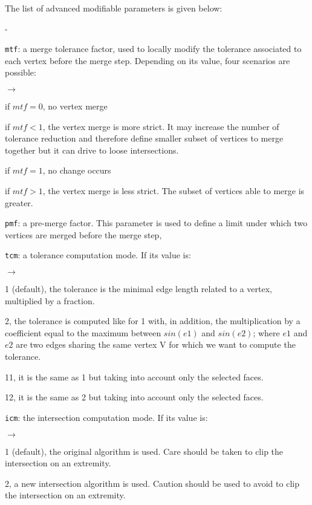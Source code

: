 {{{The list of advanced modifiable parameters is given below:
\begin{list}{-}{}
\item \texttt{mtf}: a merge tolerance factor, used to locally modify the tolerance associated to each vertex before the merge step. Depending on its value, four
scenarios are possible:
\begin{list}{$\rightarrow$}{}
\item if $mtf=0$, no vertex merge
\item if $mtf<1$, the vertex merge is more strict. It may increase the number of tolerance reduction and therefore define smaller subset of vertices to merge together but it can drive to loose intersections.
\item if $mtf=1$, no change occurs
\item if $mtf>1$, the vertex merge is less strict. The subset of vertices able to merge is greater.
\end{list}
\item \texttt{pmf}: a pre-merge factor. This parameter is used to define a limit under which two vertices are merged before the merge step,
\item \texttt{tcm}: a tolerance computation mode. If its value is:
\begin{list}{$\rightarrow$}{}
\item 1 (default), the tolerance is the minimal edge length related to a vertex, multiplied by a fraction.
\item 2, the tolerance is computed like for 1 with, in addition, the multiplication by a coefficient equal to the maximum between $sin(e1)$ and $sin(e2)$; where $e1$ and $e2$ are two edges sharing the same vertex V for which we want to compute the tolerance.
\item 11, it is the same as 1 but taking into account only the selected faces.
\item 12, it is the same as 2 but taking into account only the selected faces.
\end{list}
\item \texttt{icm}: the intersection computation mode. If its value is:
\begin{list}{$\rightarrow$}{}
\item 1 (default), the original algorithm is used. Care should be taken to clip the intersection on an extremity.
\item 2, a new intersection algorithm is used. Caution should be used to avoid to clip the intersection on an extremity.
\end{list}

\end{list}}}}
